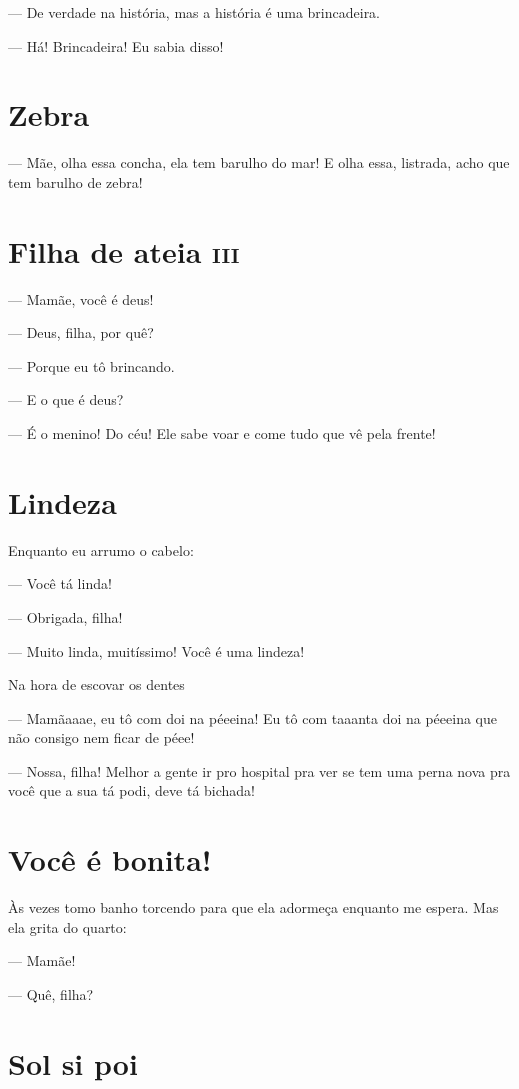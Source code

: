 {— De verdade na história, mas a história é uma brincadeira.

— Há! Brincadeira! Eu sabia disso!

\chapter{Zebra}

— Mãe, olha essa concha, ela tem barulho do mar! E olha essa, listrada,
acho que tem barulho de zebra!

\chapter{Filha de ateia \textsc{iii}}

— Mamãe, você é deus!

— Deus, filha, por quê?

— Porque eu tô brincando.

— E o que é deus?

— É o menino! Do céu! Ele sabe voar e come tudo que vê pela frente!

\chapter{Lindeza}

Enquanto eu arrumo o cabelo:

— Você tá linda!

— Obrigada, filha!

— Muito linda, muitíssimo! Você é uma lindeza!

Na hora de escovar os dentes

— Mamãaaae, eu tô com doi na péeeina! Eu tô com taaanta doi na péeeina
que não consigo nem ficar de péee!

— Nossa, filha! Melhor a gente ir pro hospital pra ver se tem uma perna
nova pra você que a sua tá podi, deve tá bichada!

\chapter{Você é bonita!}

Às vezes tomo banho torcendo para que ela adormeça enquanto me espera.
Mas ela grita do quarto:

— Mamãe!

— Quê, filha?

\chapter{Sol si poi}

}
